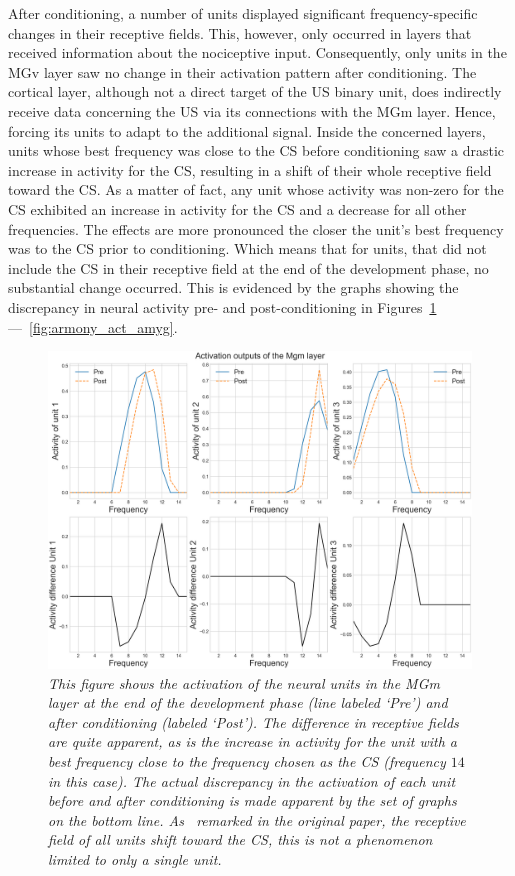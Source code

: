 After conditioning, a number of units displayed significant frequency-specific changes in their receptive fields. This, however, only occurred in layers that received information about the nociceptive input. Consequently, only units in the MGv layer saw no change in their activation pattern after conditioning. The cortical layer, although not a direct target of the US binary unit, does indirectly receive data concerning the US via its connections with the MGm layer. Hence, forcing its units to adapt to the additional signal. Inside the concerned layers, units whose best frequency was close to the CS before conditioning saw a drastic increase in activity for the CS, resulting in a shift of their whole receptive field toward the CS\@. As a matter of fact, any unit whose activity was non-zero for the CS exhibited an increase in activity for the CS and a decrease for all other frequencies. The effects are more pronounced the closer the unit's best frequency was to the CS prior to conditioning. Which means that for units, that did not include the CS in their receptive field at the end of the development phase, no substantial change occurred. This is evidenced by the graphs showing the discrepancy in neural activity pre- and post-conditioning in Figures~\ref{fig:armony_act_mgm} ---~\ref{fig:armony_act_amyg}.\\
\begin{figure}[!htbp]
   \begin{center}
      \includegraphics[width=\textwidth]{Figs/activation_mgm}
      \caption{\textit{This figure shows the activation of the neural units in the MGm layer at the end of the development phase (line labeled `\emph{Pre}') and after conditioning (labeled `\emph{Post}'). The difference in receptive fields are quite apparent, as is the increase in activity for the unit with a best frequency close to the frequency chosen as the CS (frequency $14$ in this case). The actual discrepancy in the activation of each unit before and after conditioning is made apparent by the set of graphs on the bottom line. As~\citet{Armony1995} remarked in the original paper, the receptive field of all units shift toward the CS, this is not a phenomenon limited to only a single unit.}}\label{fig:armony_act_mgm}
   \end{center}
\end{figure}

